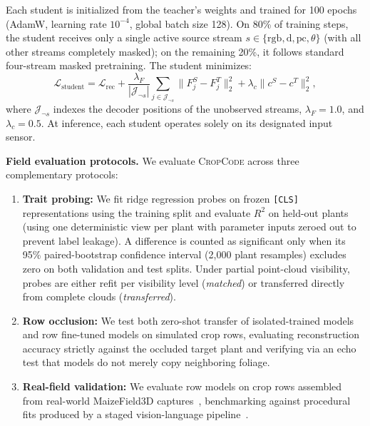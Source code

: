 \documentclass[10pt,twocolumn,letterpaper]{article}
\newcommand{\method}{\textsc{CropCode}}
\begin{document}
Each student is initialized from the teacher's weights and trained for 100 epochs (AdamW, learning rate $10^{-4}$, global batch size 128). On 80\% of training steps, the student receives only a single active source stream $s \in \{\mathrm{rgb}, \mathrm{d}, \mathrm{pc}, \theta\}$ (with all other streams completely masked); on the remaining 20\%, it follows standard four-stream masked pretraining. The student minimizes:
\begin{equation}
  \mathcal{L}_{\mathrm{student}} = \mathcal{L}_{\mathrm{rec}} + \frac{\lambda_F}{|\mathcal{J}_{\neg s}|} \sum_{j \in \mathcal{J}_{\neg s}} \|F^S_j - F^T_j\|_2^2 + \lambda_c \|c^S - c^T\|_2^2,
  \label{eq:distillation-loss}
\end{equation}
where $\mathcal{J}_{\neg s}$ indexes the decoder positions of the unobserved streams, $\lambda_F = 1.0$, and $\lambda_c = 0.5$. At inference, each student operates solely on its designated input sensor.

\noindent\textbf{Field evaluation protocols.}
We evaluate \method{} across three complementary protocols:
\begin{enumerate}
  \item \textbf{Trait probing:} We fit ridge regression probes on frozen \texttt{[CLS]} representations using the training split and evaluate $R^2$ on held-out plants (using one deterministic view per plant with parameter inputs zeroed out to prevent label leakage). A difference is counted as significant only when its 95\% paired-bootstrap confidence interval (2{,}000 plant resamples) excludes zero on both validation and test splits. Under partial point-cloud visibility, probes are either refit per visibility level (\emph{matched}) or transferred directly from complete clouds (\emph{transferred}).
  \item \textbf{Row occlusion:} We test both zero-shot transfer of isolated-trained models and row fine-tuned models on simulated crop rows, evaluating reconstruction accuracy strictly against the occluded target plant and verifying via an echo test that models do not merely copy neighboring foliage.
  \item \textbf{Real-field validation:} We evaluate row models on crop rows assembled from real-world MaizeField3D captures~\citep{maizefield3d2025}, benchmarking against procedural fits produced by a staged vision-language pipeline~\citep{hadadi2026vlmmaize}.
\end{enumerate}

\end{document}
